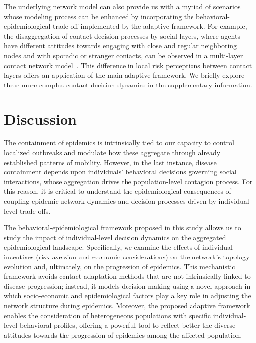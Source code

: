 \documentclass[9pt,twocolumn,twoside]{pnas-new}
\begin{document}
The underlying network model can also provide us with a myriad of scenarios whose modeling process can be enhanced by incorporating the behavioral-epidemiological trade-off implemented by the adaptive framework. For example, the disaggregation of contact decision processes by social layers, where agents have different attitudes towards engaging with close and regular neighboring nodes and with sporadic or stranger contacts, can be observed in a multi-layer contact network model~\cite{Network2}. This difference in local risk perceptions between contact layers offers an application of the main adaptive framework. We briefly explore these more complex contact decision dynamics in the supplementary information.

\section*{Discussion}


%
The containment of epidemics is intrinsically tied to our capacity to control localized outbreaks and modulate how these aggregate through already established patterns of mobility. However, in the last instance, disease containment depends upon individuals' behavioral decisions governing social interactions, whose aggregation drives the population-level contagion process. For this reason, it is critical to understand the epidemiological consequences of coupling epidemic network dynamics and decision processes driven by individual-level trade-offs.

The behavioral-epidemiological framework proposed in this study allows us to study the impact of individual-level decision dynamics on the aggregated epidemiological landscape. Specifically, we examine the effects of individual incentives (risk aversion and economic considerations) on the network's topology evolution and, ultimately, on the progression of epidemics.
This mechanistic framework avoids contact adaptation methods that are not intrinsically linked to disease progression; instead, it models decision-making using a novel approach in which socio-economic and epidemiological factors play a key role in adjusting the network structure during epidemics. Moreover, the proposed adaptive framework enables the consideration of heterogeneous populations with specific individual-level behavioral profiles, offering a powerful tool to reflect better the diverse attitudes towards the progression of epidemics among the affected population.
\end{document}
